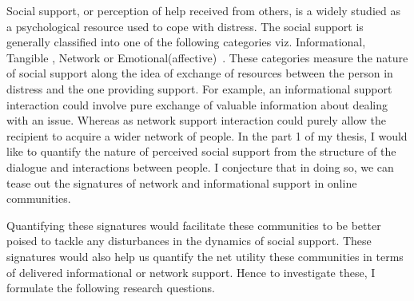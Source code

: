 Social support, or perception of help received from others, is a widely studied as a psychological resource used to cope with distress. The social support is generally classified into one of the following categories viz. Informational, Tangible , Network or Emotional(affective)~\cite{cutrona1992controllability}. These categories measure the nature of social support along the idea of exchange of resources between the person in distress and the one providing support. For example, an informational support interaction could involve pure exchange of valuable information about dealing with an issue. Whereas as network support interaction could purely allow the recipient to acquire a wider network of people.
In the part 1 of my thesis, I would like to quantify the nature of perceived social support from the structure of the dialogue and interactions between people. I conjecture that in doing so, we can tease out the signatures of network and informational support in online communities. 
 
Quantifying these signatures would facilitate these communities to be better poised to tackle any disturbances in the dynamics of social support. These signatures would also help us quantify the net utility these communities in terms of delivered informational or network support. Hence to investigate these, I formulate the following research questions.

\noindent{}

\noindent{}
\noindent{}
\noindent{}
\vspace{1cm}

